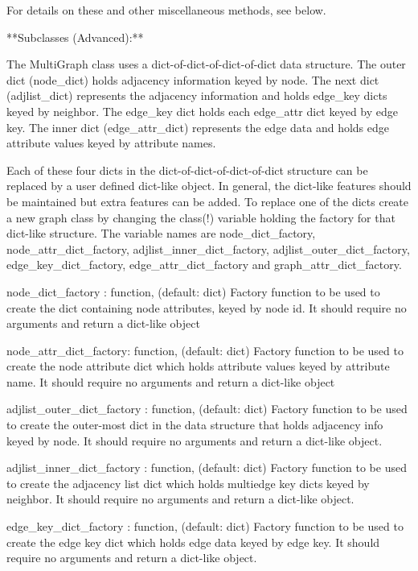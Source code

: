 \begin{DoxyVerb}
For details on these and other miscellaneous methods, see below.

**Subclasses (Advanced):**

The MultiGraph class uses a dict-of-dict-of-dict-of-dict data structure.
The outer dict (node_dict) holds adjacency information keyed by node.
The next dict (adjlist_dict) represents the adjacency information and holds
edge_key dicts keyed by neighbor. The edge_key dict holds each edge_attr
dict keyed by edge key. The inner dict (edge_attr_dict) represents
the edge data and holds edge attribute values keyed by attribute names.

Each of these four dicts in the dict-of-dict-of-dict-of-dict
structure can be replaced by a user defined dict-like object.
In general, the dict-like features should be maintained but
extra features can be added. To replace one of the dicts create
a new graph class by changing the class(!) variable holding the
factory for that dict-like structure. The variable names are
node_dict_factory, node_attr_dict_factory, adjlist_inner_dict_factory,
adjlist_outer_dict_factory, edge_key_dict_factory, edge_attr_dict_factory
and graph_attr_dict_factory.

node_dict_factory : function, (default: dict)
    Factory function to be used to create the dict containing node
    attributes, keyed by node id.
    It should require no arguments and return a dict-like object

node_attr_dict_factory: function, (default: dict)
    Factory function to be used to create the node attribute
    dict which holds attribute values keyed by attribute name.
    It should require no arguments and return a dict-like object

adjlist_outer_dict_factory : function, (default: dict)
    Factory function to be used to create the outer-most dict
    in the data structure that holds adjacency info keyed by node.
    It should require no arguments and return a dict-like object.

adjlist_inner_dict_factory : function, (default: dict)
    Factory function to be used to create the adjacency list
    dict which holds multiedge key dicts keyed by neighbor.
    It should require no arguments and return a dict-like object.

edge_key_dict_factory : function, (default: dict)
    Factory function to be used to create the edge key dict
    which holds edge data keyed by edge key.
    It should require no arguments and return a dict-like object.


\end{DoxyVerb}
